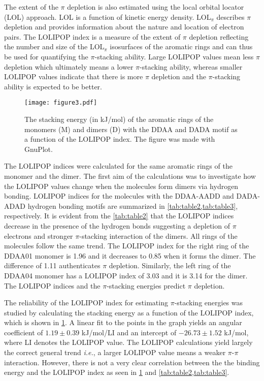 \documentclass[twoside,twocolumn,9pt]{article}
\begin{document}
The extent of the $\pi$ depletion is also estimated using the local orbital
locator (LOL) approach. LOL is a function of kinetic energy density.
LOL$_{\pi}$ describes $\pi$ depletion and provides information about the nature
and location of electron pairs\cite{C1CP21055F}.  The LOLIPOP index is a 
measure of the extent of ${\pi}$ depletion reflecting the number and size of the
LOL$_{\pi}$ isosurfaces of the aromatic rings and can thus be used for 
quantifying the $\pi$-stacking ability. 
Large LOLIPOP values mean less $\pi$ depletion which ultimately means a lower
$\pi$-stacking ability, whereas smaller LOLIPOP values indicate that there is
more $\pi$ depletion and the $\pi$-stacking ability is expected to be better. 


\begin{figure}[H] \centering
\texttt{[image: figure3.pdf]}
\caption{The stacking energy (in kJ/mol) of the aromatic rings of the monomers (M) and dimers (D) with the DDAA and DADA motif as a function of the LOLIPOP index. The figure was made with GnuPlot\cite{gnuplot}.} 
\label{fig:figure3} 
\end{figure}

The LOLIPOP indices were calculated for the same aromatic rings of the monomer
and the dimer.  The first aim of the calculations was to investigate how the
LOLIPOP values change when the molecules form dimers via hydrogen bonding.
LOLIPOP indices for the molecules with the DDAA-AADD and DADA-ADAD hydrogen
bonding motifs are summarized in \cref{tab:table2,tab:table3}, respectively.
It is evident from the \cref{tab:table2} that the LOLIPOP indices decrease in
the presence of the hydrogen bonds suggesting a depletion of $\pi$ electrons
and stronger $\pi$-stacking interaction of the dimers. All rings of the
molecules follow the same trend. The LOLIPOP index for the right ring of the
DDAA01 monomer is 1.96 and it decreases to 0.85 when it forms the dimer. The
difference of 1.11 authenticates $\pi$ depletion.  Similarly, the left ring of
the DDAA04 monomer has a LOLIPOP index of 3.03 and it is 3.14 for the dimer.
The LOLIPOP indices and the $\pi$-stacking energies predict $\pi$ depletion.

The reliability of the LOLIPOP index for estimating $\pi$-stacking energies was
studied by calculating the stacking energy as a function of the LOLIPOP index,
which is shown in \cref{fig:figure3}. A linear fit to the points in the graph
yields an angular coefficient of $1.19 \pm 0.39$ kJ/mol/LI and an intercept of
$-26.73 \pm 1.52$ kJ/mol, where LI denotes the LOLIPOP value.  The LOLIPOP
calculations yield largely the correct general trend \textit{i.e.}, a larger
LOLIPOP value means a weaker $\pi$-$\pi$ interaction. However, there is not a
very clear correlation between the the binding energy and the LOLIPOP index as
seen in \cref{fig:figure3} and \cref{tab:table2,tab:table3}.
\end{document}
